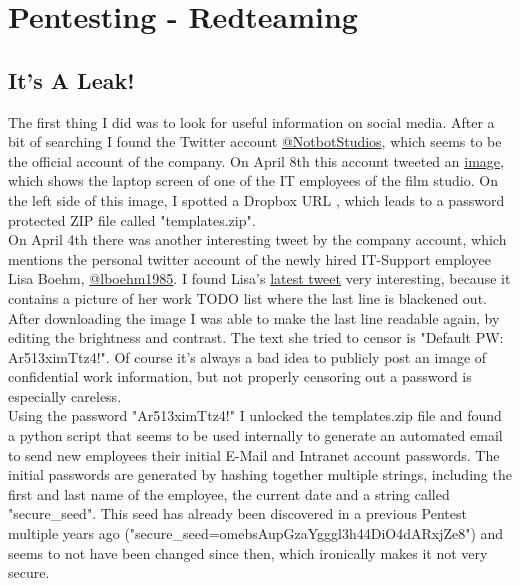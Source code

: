 \section{Pentesting - Redteaming}

\subsection{It's A Leak!}
The first thing I did was to look for useful information on social media. After a bit of searching I found the Twitter account \href{https://twitter.com/notbotstudios}{@NotbotStudios}, which seems to be the official account of the company. On April 8th this account tweeted an \href{https://twitter.com/NotbotStudios/status/1247844703162294272}{image}, which shows the laptop screen of one of the IT employees of the film studio. On the left side of this image, I spotted a Dropbox URL \href{https://twitter.com/NotbotStudios/status/1247844703162294272}, which leads to a password protected ZIP file called "templates.zip". \\

On April 4th there was another interesting tweet by the company account, which mentions the personal twitter account of the newly hired IT-Support employee Lisa Boehm, \href{https://twitter.com/lboehm1985}{@lboehm1985}. I found Lisa's \href{https://twitter.com/lboehm1985/status/1248692516083445761}{latest tweet} very interesting, because it contains a picture of her work TODO list where the last line is blackened out. After downloading the image I was able to make the last line readable again, by editing the brightness and contrast. The text she tried to censor is "Default PW: Ar513ximTtz4!". Of course it's always a bad idea to publicly post an image of confidential work information, but not properly censoring out a password is especially careless. \\

Using the password "Ar513ximTtz4!" I unlocked the templates.zip file and found a python script that seems to be used internally to generate an automated email to send new employees their initial E-Mail and Intranet account passwords. The initial passwords are generated by hashing together multiple strings, including the first and last name of the employee, the current date and a string called "secure\_seed". This seed has already been discovered in a previous Pentest multiple years ago ("secure\_seed=\allowbreak omebsAupGzaYgggl3h44DiO4dARxjZe8") and seems to not have been changed since then, which ironically makes it not very secure. \\

